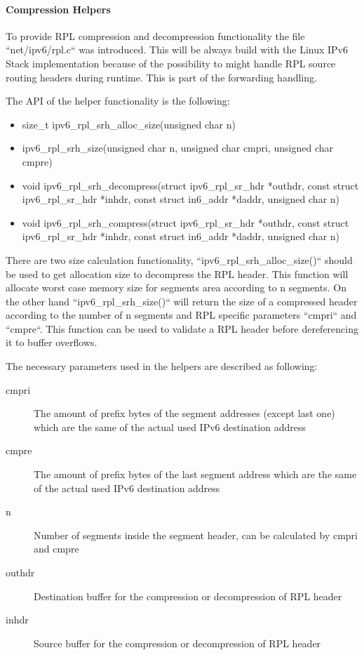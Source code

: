 \documentclass[letterpaper]{article}
\begin{document}
\paragraph{Compression Helpers}

To provide RPL compression and decompression functionality the file ``net/ipv6/rpl.c`` was introduced.
This will be always build with the Linux IPv6 Stack implementation because of the possibility to might handle RPL source routing headers during runtime.
This is part of the forwarding handling.

The API of the helper functionality is the following:

\begin{itemize}
	\item{size\_t ipv6\_rpl\_srh\_alloc\_size(unsigned char n)}
	\item{ipv6\_rpl\_srh\_size(unsigned char n, unsigned char cmpri, unsigned char cmpre)}
	\item{void ipv6\_rpl\_srh\_decompress(struct ipv6\_rpl\_sr\_hdr *outhdr, const struct ipv6\_rpl\_sr\_hdr *inhdr, const struct in6\_addr *daddr, unsigned char n)}
	\item{void ipv6\_rpl\_srh\_compress(struct ipv6\_rpl\_sr\_hdr *outhdr, const struct ipv6\_rpl\_sr\_hdr *inhdr, const struct in6\_addr *daddr, unsigned char n)}
\end{itemize}

There are two size calculation functionality, ``ipv6\_rpl\_srh\_alloc\_size()`` should be used to get allocation size to decompress the RPL header.
This function will allocate worst case memory size for segments area according to n segments.
On the other hand ``ipv6\_rpl\_srh\_size()`` will return the size of a compressed header according to the number of n segments and RPL specific parameters ``cmpri`` and ``cmpre``.
This function can be used to validate a RPL header before dereferencing it to buffer overflows.

The necessary parameters used in the helpers are described as following:

\begin{description}
	\item[cmpri]{The amount of prefix bytes of the segment addresses (except last one) which are the same of the actual used IPv6 destination address}
	\item[cmpre]{The amount of prefix bytes of the last segment address which are the same of the actual used IPv6 destination address}
	\item[n]{Number of segments inside the segment header, can be calculated by cmpri and cmpre}
	\item[outhdr]{Destination buffer for the compression or decompression of RPL header}
	\item[inhdr]{Source buffer for the compression or decompression of RPL header}
\end{description}
\end{document}
